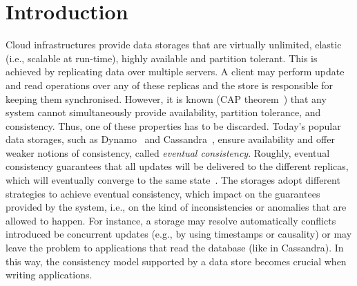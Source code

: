 
\section{Introduction}

Cloud infrastructures provide data storages that are virtually unlimited, elastic (i.e., scalable at run-time), 
highly available and partition tolerant. This is achieved by 
replicating data over multiple servers. A client may perform update and 
read operations over any of these replicas and the  store is responsible for keeping 
them synchronised. 
However, it is known (CAP theorem~\cite{CAP}) that any system cannot simultaneously provide availability, 
partition tolerance, and consistency. Thus, 
one of these properties has to be discarded. Today's popular 
data storages, such as Dynamo~\cite{DeCandia:2007:DAH:1294261.1294281} and  Cassandra~\cite{lakshman2010cassandra}, ensure 
availability and offer weaker notions of consistency,  called \emph{eventual consistency}.
Roughly, eventual consistency guarantees that all updates will be delivered to the different replicas, which will eventually converge to the same 
state~\cite{DBLP:journals/cacm/BailisG13}.
The  storages adopt different strategies to achieve eventual consistency, which   
impact on the  guarantees provided by the system, i.e., on the kind of 
inconsistencies or anomalies that are allowed to happen. For instance, a storage may
resolve automatically conflicts introduced be concurrent updates (e.g., by using timestamps or causality) or  
may leave the problem to applications that read the database (like in Cassandra).
In this way, the consistency model supported by a data store becomes crucial when writing applications. 

